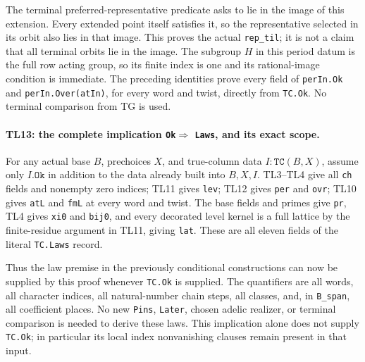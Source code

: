 The terminal preferred-representative predicate asks to lie in the
image of this extension. Every extended point itself satisfies it,
so the representative selected in its orbit also lies in that image.
This proves the actual \texttt{rep\_til}; it is not a claim that
all terminal orbits lie in the image. The subgroup $H$ in this
period datum is the full row acting group, so its finite index is
one and its rational-image condition is immediate.
The preceding identities prove every field of \texttt{perIn.Ok}
and \texttt{perIn.Over(atIn)}, for every word and twist, directly
from \texttt{TC.Ok}. No terminal comparison from TG is used.

\paragraph{TL13: the complete implication \texttt{Ok}$\Rightarrow$
\texttt{Laws}, and its exact scope.}
For any actual base $B$, prechoices $X$, and true-column data
$I:\texttt{TC}(B,X)$, assume only $I.\texttt{Ok}$ in addition to the
data already built into $B,X,I$. TL3--TL4 give all \texttt{ch} fields
and nonempty zero indices; TL11 gives \texttt{lev}; TL12 gives
\texttt{per} and \texttt{ovr}; TL10 gives \texttt{atL} and
\texttt{fmL} at every word and twist. The base fields and primes
give \texttt{pr}, TL4 gives \texttt{xi0} and \texttt{bij0}, and
every decorated level kernel is a full lattice by the finite-residue
argument in TL11, giving \texttt{lat}. These are all eleven fields
of the literal \texttt{TC.Laws} record.

Thus the law premise in the previously conditional constructions
can now be supplied by this proof whenever \texttt{TC.Ok} is
supplied. The quantifiers are all words, all character indices,
all natural-number chain steps, all classes, and, in
\texttt{B\_span}, all coefficient places. No new \texttt{Pins},
\texttt{Later}, chosen adelic realizer, or terminal comparison is
needed to derive these laws. This implication alone does not supply
\texttt{TC.Ok}; in particular its local index nonvanishing clauses
remain present in that input.

